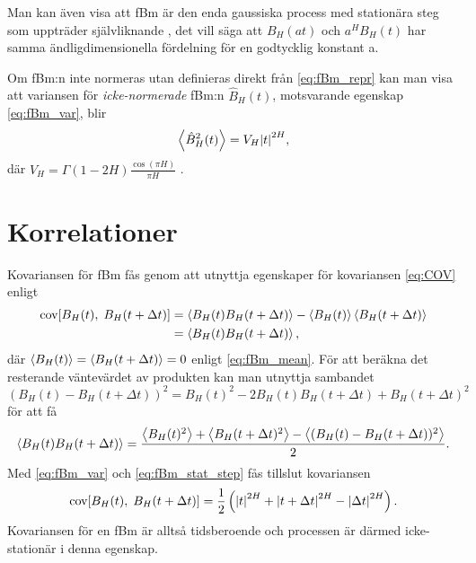 Man kan även visa att fBm är den enda gaussiska process med stationära steg som uppträder självliknande \cite{Dieker_fBm}, det vill säga att $B_H(at)$ och $a^H B_H(t)$ har samma ändligdimensionella fördelning för en godtycklig konstant a.

Om fBm:n inte normeras utan definieras direkt från \eqref{eq:fBm_repr} kan man visa att variansen för \emph{icke-normerade} fBm:n $\hat{B}_H(t)$, motsvarande egenskap \eqref{eq:fBm_var}, blir \cite{Dieker_fBm}
\begin{equation} \label{eq:fBm_onorm_var}
    \ev{\hat{B}^2_H(t)} = V_H \abs{t}^{2H},
\end{equation}
där $V_H = \Gamma(1-2H)\frac{\cos(\pi H)}{\pi H}$ \cite{Flandrin_fBmspektrum1989}.


\section{Korrelationer}
Kovariansen för fBm fås genom att utnyttja egenskaper för kovariansen \eqref{eq:COV} enligt
\begin{equation}
\begin{aligned}
    \COV{B_H(t)}{B_H(t+\Delta{t})}&=\ev{B_H(t)B_H(t+\Delta{t})}-\ev{B_H(t)}\ev{B_H(t+\Delta{t})}
    \\
    &=\ev{B_H(t)B_H(t+\Delta{t})},
\end{aligned}
\end{equation}
där $\ev{B_H(t)}=\ev{B_H(t+\Delta{t})}=0$ enligt \eqref{eq:fBm_mean}. För att beräkna det resterande väntevärdet av produkten kan man utnyttja sambandet $(B_H(t)-B_H(t+\Delta{t}))^2=B_H(t)^2 -2B_H(t)B_H(t+\Delta{t})+B_H(t+\Delta{t})^2$ för att få
\begin{equation}
    \ev{B_H(t)B_H(t+\Delta{t})}
    =\frac{
    \ev{B_H(t)^2} + \ev{B_H(t+\Delta{t})^2} - \ev{(B_H(t)-B_H(t+\Delta{t}))^2}
    }{2}.
\end{equation}
Med \eqref{eq:fBm_var} och \eqref{eq:fBm_stat_step} fås tillslut kovariansen
\begin{equation} \label{eq:fBm_cov}
    \text{cov}\!\left[B_H(t),\;B_H(t+\Delta{t})\right] = \frac{1}{2}\left(\abs{t}^{2H}+\abs{t+\Delta t}^{2H}-\abs{\Delta{t}}^{2H}\right).
\end{equation}
Kovariansen för en fBm är alltså tidsberoende och processen är därmed icke-stationär i denna egenskap. 


